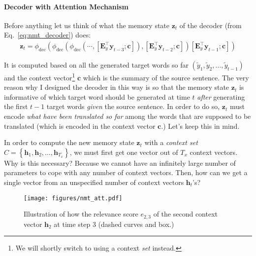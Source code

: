 \documentclass{report}
\newcommand{\vect}[1]{\mathbf{#1}}
\newcommand{\matr}[1]{\mathbf{#1}}
\newcommand{\vc}[0]{\vect{c}}
\newcommand{\vh}[0]{\vect{h}}
\newcommand{\vz}[0]{\vect{z}}
\newcommand{\vy}[0]{\vect{y}}
\newcommand{\mE}[0]{\matr{E}}
\newcommand{\dec}{\text{dec}}
\begin{document}
\paragraph{Decoder with Attention Mechanism}

Before anything let us think of what the memory state $\vz_t$ of the decoder
(from Eq.~\eqref{eq:nmt_decoder}) does:
\begin{align*}
    \vz_t = \phi_{\dec}\left( 
        \phi_{\dec}\left(
            \phi_{\dec}\left(
                \cdots, 
                \left[ \mE_y^\top \vy_{t-3}; \vc \right]
            \right),
            \left[ \mE_y^\top \vy_{t-2}; \vc \right]
        \right)
        \left[ \mE_y^\top \vy_{t-1}; \vc \right]
    \right)
\end{align*} 

It is computed based on all the generated target words so far $(\tilde{y}_1,
\tilde{y}_2, \ldots, \tilde{y}_{t-1})$ and the context vector\footnote{
    We will shortly switch to using a context {\em set} instead.
}
$\vc$ which is the summary of the source sentence. The very reason why I
designed the decoder in this way is so that the memory state $\vz_t$ is
informative of which target word should be generated at time $t$ {\em after}
generating the first $t-1$ target words {\em given} the source sentence. In
order to do so, $\vz_t$ must encode {\em what have been translated so far} among
the words that are supposed to be translated (which is encoded in the context
vector $\vc$.) Let's keep this in mind.

In order to compute the new memory state $\vz_t$ with a {\em context set}
$C=\left\{ \vh_1, \vh_2, \ldots, \vh_{T_x}\right\}$,
we must first get one vector out of $T_x$ context vectors. Why is this
necessary? Because we cannot have an infinitely large number of parameters to
cope with any number of context vectors. Then, how can we get a single vector
from an unspecified number of context vectors $\vh_t$'s?

\begin{figure}[t]
    \centering
    \centering
    \texttt{[image: figures/nmt\_att.pdf]}

    \caption{Illustration of how the relevance score $e_{2,3}$ of the second
    context vector $\vh_2$ at time step $3$ (dashed curves and box.)}
    \label{fig:att1}
\end{figure}
\end{document}
